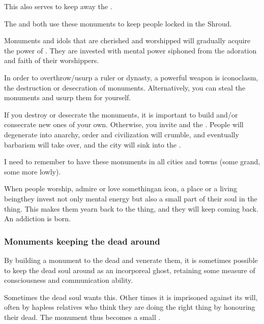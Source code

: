 This also serves to keep away the \Wylde{}.

The  and  both use these monuments to keep people locked in the Shroud.

Monuments and idols that are cherished and worshipped will gradually acquire the power of \nexi. They are invested with mental power siphoned from the adoration and faith of their worshippers.

In order to overthrow/usurp a ruler or dynasty, a powerful weapon is iconoclasm, the destruction or desecration of monuments. Alternatively, you can steal the monuments and usurp them for yourself. 

If you destroy or desecrate the monuments, it is important to build and/or consecrate new ones of your own. Otherwise, you invite  and the \Wylde{}. People will degenerate into anarchy, order and civilization will crumble, and eventually barbarism will take over, and the city will sink into the \Wylde{}.

I need to remember to have these monuments in all cities and towns (some grand, some more lowly).

When people worship, admire or love something\dash an icon, a place or a living being\dash they invest not only mental energy but also a small part of their soul in the thing. This makes them yearn back to the thing, and they will keep coming back. An addiction is born.





\subsubsection{Monuments keeping the dead around}
By building a monument to the dead and venerate them, it is sometimes possible to keep the dead soul around as an incorporeal ghost, retaining some measure of consciousness and communication ability. 

Sometimes the dead soul wants this. Other times it is imprisoned against its will, often by hapless relatives who think they are doing the right thing by honouring their dead.
The monument thus becomes a small \carcer.

